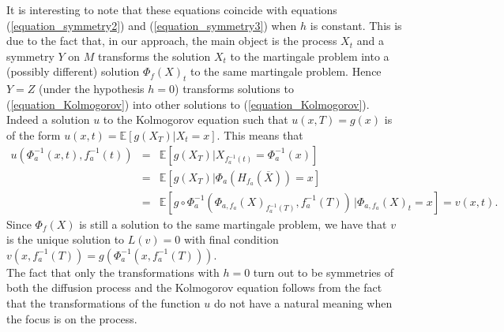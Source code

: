 \documentclass{article}[10pt]
\newcommand{\refeqn}[1]{(\ref{#1})}
\begin{document}
It is interesting to note  that  these equations coincide with equations \refeqn{equation_symmetry2} and \refeqn{equation_symmetry3} when $h$
is constant. This is due to the fact that, in our approach, the main object is the process $X_t$ and a symmetry $Y$ on $M$
 transforms the solution $X_t$ to the martingale problem into a (possibly different) solution $\Phi_f(X)_t$ to the same martingale problem. Hence $Y=Z$ (under the hypothesis $h=0$) transforms  solutions to \refeqn{equation_Kolmogorov} into  other solutions to \refeqn{equation_Kolmogorov}.\\
Indeed a solution $u$ to the Kolmogorov equation such that $u(x,T)=g(x)$ is of the form $u(x,t)=\mathbb{E}[g(X_T)|X_t=x]$. This means that
\begin{eqnarray*}
u(\Phi_a^{-1}(x,t),f_a^{-1}(t))&=&\mathbb{E}[g(X_T)|X_{f_a^{-1}(t)}=\Phi_a^{-1}(x)]\\
&=&\mathbb{E}[g(X_T)|\Phi_a(H_{f_a}(\overline{X}))=x]\\
&=&\mathbb{E}[g \circ \Phi_a^{-1}(\Phi_{a,f_a}(X)_{f_a^{-1}(T)},f_a^{-1}(T)) \, |\Phi_{a,f_a}(X)_t=x]=v(x,t).
\end{eqnarray*}
Since $\Phi_f(X)$ is still a solution to the same  martingale problem, we have that $v$ is the unique solution to $L(v)=0$ with final condition
$v(x,f_a^{-1}(T))=g(\Phi_a^{-1}(x,f_a^{-1}(T)))$. \\
The fact that only the transformations with $h=0$ turn out to be symmetries of both the diffusion process and the Kolmogorov equation follows from the fact that
the transformations of the function $u$ do not  have a natural meaning when the focus is on the process.  \\
\end{document}
